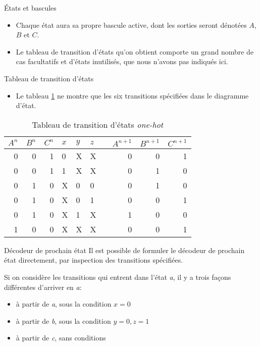 \documentclass[presentation]{beamer}
\begin{document}
\begin{frame}[label={sec:orgcdda7ac}]{États et bascules}
\begin{itemize}
\item Chaque état aura sa propre bascule active, dont les sorties seront dénotées \(A\), \(B\) et \(C\).

\item Le tableau de transition d'états qu'on obtient comporte un grand nombre de cas facultatifs et d'états inutilisés, que nous n'avons pas indiqués ici.
\end{itemize}
\end{frame}

\begin{frame}[label={sec:org6d58e1e}]{Tableau de transition d'états}
\begin{itemize}
\item Le tableau \ref{tab:orgb2f24ab} ne montre que les six transitions spécifiées dans le diagramme d'état.
\end{itemize}

\begin{table}[htbp]
\caption{\label{tab:orgb2f24ab}Tableau de transition d'états \emph{one-hot}}
\centering
\begin{tabular}{rrrllllrrr}
\(A^n\) & \(B^n\) & \(C^n\) & \(x\) & \(y\) & \(z\) &  & \(A^{n+1}\) & \(B^{n+1}\) & \(C^{n+1}\)\\[0pt]
\hline
0 & 0 & 1 & 0 & X & X &  & 0 & 0 & 1\\[0pt]
0 & 0 & 1 & 1 & X & X &  & 0 & 1 & 0\\[0pt]
0 & 1 & 0 & X & 0 & 0 &  & 0 & 1 & 0\\[0pt]
0 & 1 & 0 & X & 0 & 1 &  & 0 & 0 & 1\\[0pt]
0 & 1 & 0 & X & 1 & X &  & 1 & 0 & 0\\[0pt]
1 & 0 & 0 & X & X & X &  & 0 & 0 & 1\\[0pt]
\end{tabular}
\end{table}
\end{frame}

\begin{frame}[label={sec:org72895c0}]{Décodeur de prochain état}
Il est possible de formuler le décodeur de prochain état directement,
par inspection des transitions spécifiées.  

Si on considère les transitions qui entrent dans l'état \emph{a}, il y a trois façons différentes d'arriver en \emph{a}:
\begin{itemize}
\item à partir de \emph{a}, sous la condition \(x=0\)
\item à partir de \emph{b}, sous la condition \(y=0, z=1\)
\item à partir de \emph{c}, sans conditions
\end{itemize}
\end{frame}
\end{document}
